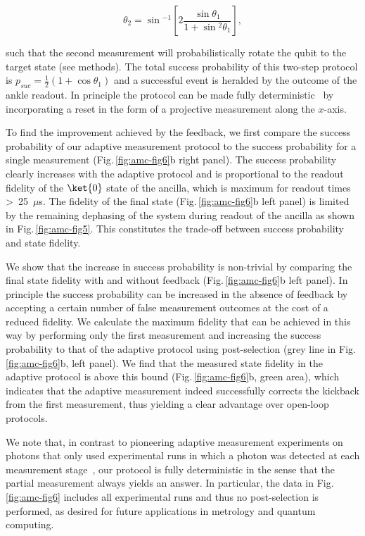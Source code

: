 \begin{equation}
\theta_2 = \sin{^{-1}\left[2 \frac{\sin{\theta_1}}{1 + \sin{^2 \theta_1}}\right]},
\end{equation}

such that the second measurement will probabilistically rotate the qubit to the target state (see methods). The total success probability of this two-step protocol is  $p_{suc} = \frac{1}{2}(1 + \cos{\theta_1})$ and a successful event is heralded by the outcome of the ankle readout. In principle the protocol can be made fully deterministic~\cite{Ashhab_PhysRevA_2010} by incorporating a reset in the form of a projective measurement along the $x$-axis.

To find the improvement achieved by the feedback, we first compare the success probability of our adaptive measurement protocol to the success probability for a single measurement (Fig.\,\ref{fig:amc-fig6}b right panel). The success probability clearly increases with the adaptive protocol and is proportional to the readout fidelity of the $\ket{0}$ state of the ancilla, which is maximum for readout times  \textgreater~25~$\mu$s. The fidelity of the final state (Fig.\,\ref{fig:amc-fig6}b left panel) is limited by the remaining dephasing of the system during readout of the ancilla as shown in Fig.\,\ref{fig:amc-fig5}. This constitutes the trade-off between success probability and state fidelity. 

We show that the increase in success probability is non-trivial by comparing the final state fidelity with and without feedback (Fig.\,\ref{fig:amc-fig6}b left panel). In principle the success probability can be increased in the absence of feedback by accepting a certain number of false measurement outcomes at the cost of a reduced fidelity. We calculate the maximum fidelity that can be achieved in this way by performing only the first measurement and increasing the success probability to that of the adaptive protocol using post-selection (grey line in Fig.\,\ref{fig:amc-fig6}b, left panel). We find that the measured state fidelity in the adaptive protocol is above this bound (Fig.\,\ref{fig:amc-fig6}b, green area), which indicates that the adaptive measurement indeed successfully corrects the kickback from the first measurement, thus yielding a clear advantage over open-loop protocols.



We note that, in contrast to pioneering adaptive measurement experiments on photons that only used experimental runs in which a photon was detected at each measurement stage~\cite{Prevedel_Nature_2007}, our protocol is fully deterministic in the sense that the partial measurement always yields an answer. In particular, the data in Fig.\,\ref{fig:amc-fig6} includes all experimental runs and thus no post-selection is performed, as desired for future applications in metrology and quantum computing. 

